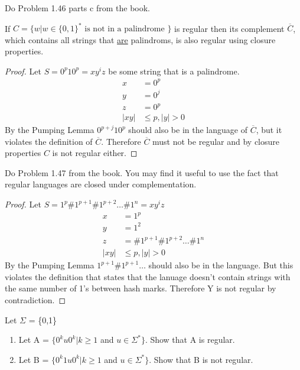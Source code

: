 \begin{problem}{4}
  Do Problem 1.46 parts c from the book.
  \begin{solution}
    If $C = \{ w|w \in \{ 0,1 \}^* \text{ is not in a palindrome }\}$ is regular then its complement $\overline{C}$, which contains
    all strings that \underline{are} palindroms, is also regular using closure properties.
    \begin{proof}
      Let $S = 0^p10^p = xy^iz$ be some string that is a palindrome. \\
      \begin{align*}
        x &= 0^p \\
        y &= 0^j \\
        z &= 0^p \\
        |xy| &\le p, |y| > 0
      \end{align*}
      By the Pumping Lemma $0^{p+j}10^p$ should also be in the language of $\overline{C}$, but it violates the definition of
      $\overline{C}$. Therefore $\overline{C}$ must not be regular and by closure properties $C$ is not regular either.
    \end{proof}
  \end{solution}
\end{problem}

\begin{problem}{5}
  Do Problem 1.47 from the book. You may find it useful to use the fact that regular languages are closed under
  complementation.
  \begin{solution}
    \begin{proof}
      Let $S = 1^p\#1^{p+1}\#1^{p+2}\ldots\#1^{n} = xy^iz$
      \begin{align*}
        x &= 1^p \\
        y &= 1^2 \\
        z &= \#1^{p + 1}\#1^{p + 2}\ldots\#1^{n} \\
        |xy| &\le p, |y| > 0
      \end{align*}
      By the Pumping Lemma $1^{p+1}\#1^{p+1}\ldots$ should also be in the language. But this violates the definition
      that states that the lanuage doesn't contain strings with the same number of 1's between hash marks. Therefore Y
      is not regular by contradiction.
    \end{proof}
  \end{solution}
\end{problem} \newpage

\begin{problem}{6}
  Let $\Sigma$ = \{0,1\}
  \begin{enumerate}
    \item Let A = $\{ 0^ku0^k | k \ge 1$ and $u \in \Sigma^* \}$. Show that A is regular. \\
    \item Let B = $\{ 0^k1u0^k | k \ge 1$ and $u \in \Sigma^* \}$. Show that B is not regular.
  \end{enumerate}
\end{problem}

